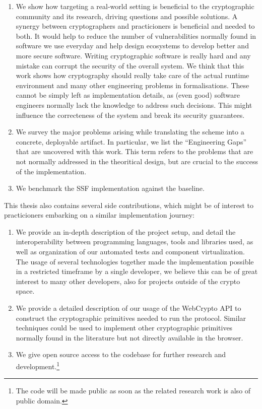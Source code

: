 \begin{enumerate}
    \item We show how targeting a real-world setting is beneficial to the cryptographic community and its research, driving questions and possible solutions. A synergy between cryptographers and practicioners is beneficial and needed to both. It would help to reduce the number of vulnerabilities normally found in software we use everyday and help design ecosystems to develop better and more secure software. Writing cryptographic software is really hard and any mistake can corrupt the security of the overall system. We think that this work shows how cryptography should really take care of the actual runtime environment and many other engineering problems in formalisations. These cannot be simply left as implementation details, as (even good) software engineers normally lack the knowledge to address such decisions. This might influence the correcteness of the system and break its security guarantees.
    \item We survey the major problems arising while translating the scheme into a concrete, deployable artifact. In particular, we list the ``Engineering Gaps'' that are uncovered with this work. This term refers to the problems that are not normally addressed in the theoritical design, but are crucial to the success of the implementation.
    \item We benchmark the SSF implementation against the baseline.
\end{enumerate}

This thesis also contains several side contributions, which might be of interest to
practicioners embarking on a similar implementation journey:
\begin{enumerate}
    \item We provide an in-depth description of the project setup, and detail the interoperability between programming languages, tools and libraries used, as well as organization of our automated tests and component virtualization. The usage of several technologies together made the implementation possible in a restricted timeframe by a single developer, we believe this can be of great interest to many other developers, also for projects outside of the crypto space. 
    \item We provide a detailed description of our usage of the WebCrypto API to construct the cryptographic primitives needed to run the protocol. Similar techniques could be used to implement other cryptographic primitives normally found in the literature but not directly available in the browser. 
    \item We give open source access to the codebase for further research and development.\footnote{The code will be made public as soon as the related research work is also of public domain.}
\end{enumerate}

